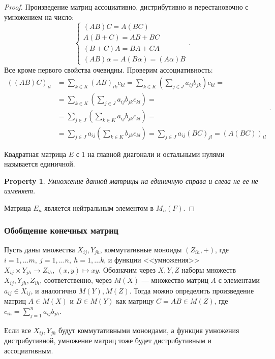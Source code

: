 \documentclass[11pt]{book}
\theoremstyle{definition}
\theoremstyle{plain}
\theoremstyle{plain}
\newtheorem*{prop}{Property}
\theoremstyle{definition}
\theoremstyle{remark}
\begin{document}
\begin{proof}
    Произведение матриц ассоциативно, дистрибутивно и  перестановочно  с умножением на число:
    \[
	\begin{cases}
	    (AB)C = A(BC)\\
	    A(B+C) = AB + BC\\
	    (B+C)A=BA + CA\\
	    (AB)\alpha = A(B\alpha) = (A\alpha)B
	\end{cases}
    .\] 
    Все кроме первого свойства очевидны. Проверим ассоциативность:
    \[
    \begin{aligned}
	\left( (AB) C \right)_{il} &= \sum _{k \in K} (AB)_{ik} c_{kl} = \sum_{k \in K}\left( \sum_{j \in J} a_{ij}b_{jk} \right)  c_{kl}  = \\
			      &= \sum_{k \in K} \left( \sum _{j \in J} a_{ij} b_{jk} c_{kl}\right) = \\
			      &= \sum _{j \in J} \left( \sum _{k \in K} a_{ij} b_{jk} c_{kl} \right) = \\
			      &= \sum _{j \in J} a_{ij} \left( \sum _{k \in K}b_{jk} c_{kl} \right) = \sum _{j \in J} a_{ij} (BC) _{jl} = \left( A(BC) \right)_{il} 
    \end{aligned}
    .\] 
\begin{defn}
    Квадратная матрица  $ E$ с 1 на главной диагонали и остальными нулями называется единичной. 
\end{defn}
\begin{prop}
    Умножение данной матрицы на единичную справа и слева не ее не изменяет.
\end{prop}
Матрица $ E_n$ является нейтральным элементом в $ M_n(F)$.
\end{proof}
\subsubsection{Обобщение конечных матриц}
Пусть даны множества $ X_{ij}, Y_{jh}$, коммутативные моноиды $ (Z_{ih}, +)$, где $ i = 1, \ldots m, ~ j = 1, \ldots n, ~ h= 1, \ldots k$, и функции <<умножения>> $ X_{ij} \times Y_{jh} \to  Z_{ih}, ~ (x, y) \mapsto xy$.  Обозначим через $ X, Y, Z$ наборы множеств  $ X_{ij}, Y_{jh}, Z_{ih}$, соответственно, через $ M(X)$ --- множество матриц  $ A$ с элементами  $ a_{ij} \in X_{ij}$, и аналогично $ M(Y), M(Z)$. Тогда можно определить произведение матриц $ A \in M(X)$ и $ B \in M(Y)$ как матрицу $ C = AB \in M(Z)$, где $ c_{ih} = \sum\limits_{j = 1}^{n}a_{ij}b_{jh}$.

Если все $ X_{ij}, Y_{jh}$ будут коммутативными моноидами, а функция умножения дистрибутивной, умножение матриц тоже будет дистрибутивным и ассоциативным.
\end{document}
